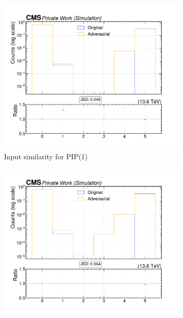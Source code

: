 \begin{figure}[htbp]
  \centering
  \begin{subfigure}[t]{0.32\textwidth}
    \includegraphics[width=\linewidth]{media/output/features/compare/intprob_1/cmp_cpf_arr_Cpfcan_quality.pdf}
    \caption{Input similarity for PIP(1)}
  \end{subfigure}\hfill
  \begin{subfigure}[t]{0.32\textwidth}
    \includegraphics[width=\linewidth]{media/output/features/compare/intprob_2/cmp_cpf_arr_Cpfcan_quality.pdf}

\end{subfigure}
\end{figure}

